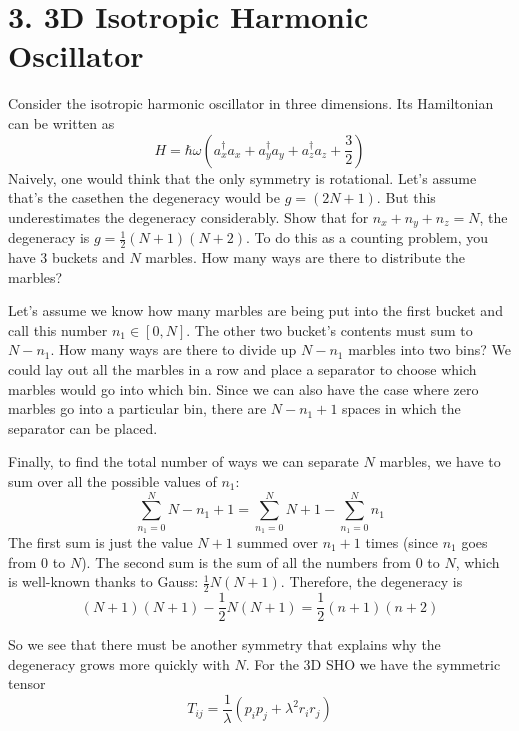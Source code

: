 \documentclass[a4paper,twoside]{article}
\begin{document}
\section*{3. 3D Isotropic Harmonic Oscillator}
Consider the isotropic harmonic oscillator in three dimensions. Its Hamiltonian can be written as 
\begin{equation}
    H = \hbar \omega\left(a^\dagger_x a_x + a^\dagger_y a_y + a^\dagger_z a_z + \frac{3}{2} \right)
\end{equation}
Naively, one would think that the only symmetry is rotational. Let's assume that's the case\textemdash then the degeneracy would be $ g = (2N+1) $. But this underestimates the degeneracy considerably. Show that for $ n_x + n_y + n_z = N $, the degeneracy is $ g = \frac{1}{2} (N+1)(N+2) $. To do this as a counting problem, you have $ 3 $ buckets and $ N $ marbles. How many ways are there to distribute the marbles?
\begin{problem}
    Let's assume we know how many marbles are being put into the first bucket and call this number $ n_1 \in [0,N] $. The other two bucket's contents must sum to $ N - n_1 $. How many ways are there to divide up $ N - n_1 $ marbles into two bins? We could lay out all the marbles in a row and place a separator to choose which marbles would go into which bin. Since we can also have the case where zero marbles go into a particular bin, there are $ N - n_1 + 1 $ spaces in which the separator can be placed.
    
    Finally, to find the total number of ways we can separate $ N $ marbles, we have to sum over all the possible values of $ n_1 $:
    \begin{equation}
        \sum_{n_1=0}^{N} N-n_1+1 = \sum_{n_1=0}^{N} N+1 - \sum_{n_1=0}^{N} n_1
    \end{equation}
    The first sum is just the value $ N + 1 $ summed over $ n_1 + 1 $ times (since $ n_1 $ goes from $ 0 $ to $ N $). The second sum is the sum of all the numbers from $ 0 $ to $ N $, which is well-known thanks to Gauss: $ \frac{1}{2} N(N+1) $. Therefore, the degeneracy is
    \begin{equation}
        (N+1)(N+1) - \frac{1}{2} N(N+1) = \frac{1}{2} (n+1)(n+2)
    \end{equation}
\end{problem}
So we see that there must be another symmetry that explains why the degeneracy grows more quickly with $ N $. For the 3D SHO we have the symmetric tensor
\begin{equation}
    T_{ij} = \frac{1}{\lambda}(p_i p_j + \lambda^2 r_i r_j)
\end{equation}
\end{document}
